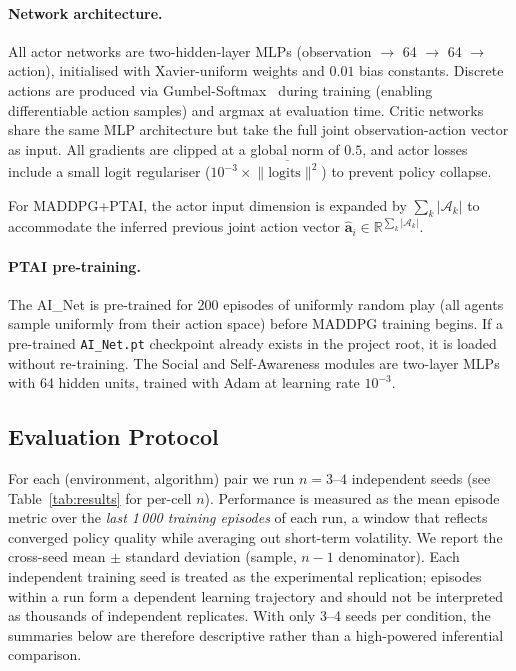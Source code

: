 \documentclass[12pt]{article}
\begin{document}
\paragraph{Network architecture.}
All actor networks are two-hidden-layer MLPs (observation $\to$ 64 $\to$ 64 $\to$ action),
initialised with Xavier-uniform weights and $0.01$ bias constants.
Discrete actions are produced via Gumbel-Softmax~\cite{jang2017categorical} during training
(enabling differentiable action samples) and argmax at evaluation time.
Critic networks share the same MLP architecture but take the full joint observation-action
vector as input.
All gradients are clipped at a global norm of $0.5$, and actor losses include a small
logit regulariser ($10^{-3} \times \overline{\|\text{logits}\|^2}$) to prevent
policy collapse.

For MADDPG+PTAI, the actor input dimension is expanded by
$\sum_k |\mathcal{A}_k|$ to accommodate the inferred previous joint action vector
$\widehat{\mathbf{a}}_i \in \mathbb{R}^{\sum_k |\mathcal{A}_k|}$.

\paragraph{PTAI pre-training.}
The AI\_Net is pre-trained for 200 episodes of uniformly random play (all agents sample
uniformly from their action space) before MADDPG training begins. If a pre-trained
\texttt{AI\_Net.pt} checkpoint already exists in the project root, it is loaded without
re-training. The Social and Self-Awareness modules are two-layer MLPs with 64 hidden
units, trained with Adam at learning rate $10^{-3}$.

\subsection{Evaluation Protocol}

For each (environment, algorithm) pair we run $n = 3$--$4$ independent seeds (see
Table~\ref{tab:results} for per-cell $n$). Performance is measured as the mean episode
metric over the \emph{last 1\,000 training episodes} of each run, a window that reflects
converged policy quality while averaging out short-term volatility. We report the
cross-seed mean $\pm$ standard deviation (sample, $n-1$ denominator). Each independent
training seed is treated as the experimental replication; episodes within a run form a
dependent learning trajectory and should not be interpreted as thousands of independent
replicates. With only 3--4 seeds per condition, the summaries below are therefore
descriptive rather than a high-powered inferential comparison.
\end{document}
